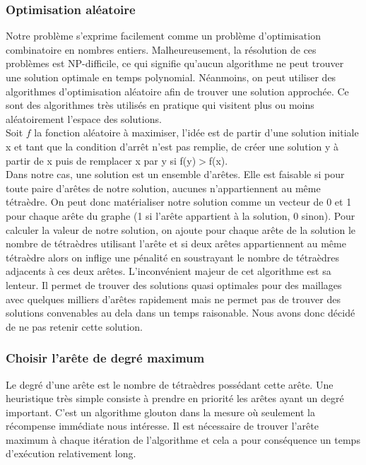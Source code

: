 \subsubsection{Optimisation aléatoire}
\noindent
Notre problème s'exprime facilement comme un problème d'optimisation combinatoire en nombres entiers. Malheureusement, la résolution de ces problèmes est NP-difficile, ce qui signifie qu'aucun algorithme ne peut trouver une solution optimale en temps polynomial. Néanmoins, on peut utiliser des algorithmes d'optimisation aléatoire afin de trouver une solution approchée. Ce sont des algorithmes très utilisés en pratique qui visitent plus ou moins aléatoirement l'espace des solutions.\\
Soit $f$ la fonction aléatoire à maximiser, l'idée est de partir d'une solution initiale x et tant que la condition d'arrêt n'est pas remplie, de créer une solution y à partir de x puis de remplacer x par y si f(y)$>$f(x).\\
Dans notre cas, une solution est un ensemble d'arêtes. Elle est faisable si pour toute paire d'arêtes de notre solution, aucunes n'appartiennent au même tétraèdre. On peut donc matérialiser notre solution comme un vecteur de 0 et 1 pour chaque arête du graphe (1 si l'arête appartient à la solution, 0 sinon). Pour calculer la valeur de notre solution, on ajoute pour chaque arête de la solution le nombre de tétraèdres utilisant l'arête et si deux arêtes appartiennent au même tétraèdre alors on inflige une pénalité en soustrayant le nombre de tétraèdres adjacents à ces deux arêtes. L'inconvénient majeur de cet algorithme est sa lenteur. Il permet de trouver des solutions quasi optimales pour des maillages avec quelques milliers d'arêtes rapidement mais ne permet pas de trouver des solutions convenables au dela dans un temps raisonable. Nous avons donc décidé de ne pas retenir cette solution.

\subsubsection{Choisir l'arête de degré maximum}
\noindent
Le degré d'une arête est le nombre de tétraèdres possédant cette arête. Une heuristique très simple consiste à prendre en priorité les arêtes ayant un degré important. C'est un algorithme glouton dans la mesure où seulement la récompense immédiate nous intéresse. Il est nécessaire de trouver l'arête maximum à chaque itération de l'algorithme et cela a pour conséquence un temps d'exécution relativement long.
